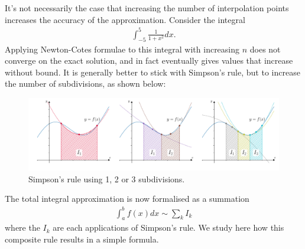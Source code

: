 It's not necessarily the case that increasing the number of interpolation points increases the accuracy of the approximation. Consider the integral
\begin{align*}
\int_{-5}^5 \frac{1}{1+x^2} dx.
\end{align*}
Applying Newton-Cotes formulae to this integral with increasing $n$ does not converge on the exact solution, and in fact eventually gives values that increase without bound. It is generally better to stick with Simpson's rule, but to increase the number of subdivisions, as shown below:
\begin{figure}[H]
	\begin{center}
	\includegraphics[width=\textwidth]{figures/ch5_simpsons_refinement.pdf} 
	  \caption{Simpson's rule using 1, 2 or 3 subdivisions.} \label{fig:ch5_simpsons_refinement}
	\end{center}
\end{figure}

\noindent The total integral approximation is now formalised as a summation
\begin{align*}
\int_a^b f(x)dx \sim \sum_k I_k
\end{align*}
where the $I_k$ are each applications of Simpson's rule. We study here how this composite rule results in a simple formula. 


